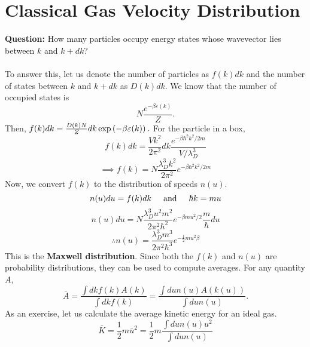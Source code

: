 \section{Classical Gas Velocity Distribution}
    \textbf{Question:} How many particles occupy energy states whose wavevector lies between $k$ and $k+dk$?\\
    \\
    To answer this, let us denote the number of particles as $f(k)dk$ and the number of states between $k$ and $k+dk$ as $D(k)dk$. We know that the number of occupied states is
    \begin{equation}
        N\frac{e^{-\beta\varepsilon(k)}}{Z}.
    \end{equation}
    Then, $f(k)dk = \frac{D(k)N}{Z}dk\exp\left( -\beta\varepsilon(k) \right).$
    For the particle in a box,
    \begin{equation}
        f(k)dk = \frac{Vk^2}{2\pi^2}dk\frac{e^{-\beta\hbar^2k^2/2m}}{V/\lambda_D^3}
    \end{equation}
    \begin{equation}
        \implies f(k) = N\frac{\lambda_D^3k^2}{2\pi^2}e^{-\beta\hbar^2k^2/2m}
    \end{equation}
    Now, we convert $f(k)$ to the distribution of speeds $n(u)$.
    \begin{equation}
        n(u)du = f(k)dk \hspace{0.5cm}\mathrm{and}\hspace{0.5cm}\hbar k=mu
    \end{equation}
    \begin{equation}
        n(u)du = N\frac{\lambda_D^3u^2m^2}{2\pi^2\hbar^2}e^{-\beta mu^2/2}\frac{m}{\hbar}du
    \end{equation}
    \begin{equation}
        \therefore n(u) = \frac{\lambda_D^3m^3}{2\pi^2\hbar^3}e^{-\frac{1}{2}mu^2\beta}
    \end{equation}
    This is the \textbf{Maxwell distribution}. Since both the $f(k)$ and $n(u)$ are probability distributions, they can be used to compute averages. For any quantity $A$,
    \begin{equation}
        \bar{A} = \frac{\int dkf(k)A(k)}{\int dkf(k)} = \frac{\int dun(u)A(k(u))}{\int dun(u)}.
    \end{equation}
    As an exercise, let us calculate the average kinetic energy for an ideal gas.
    \begin{equation}
        \bar{K} = \frac{1}{2}m\bar{u}^2 = \frac{1}{2}m\frac{\int du n(u)u^2}{\int dun(u)}
    \end{equation}
